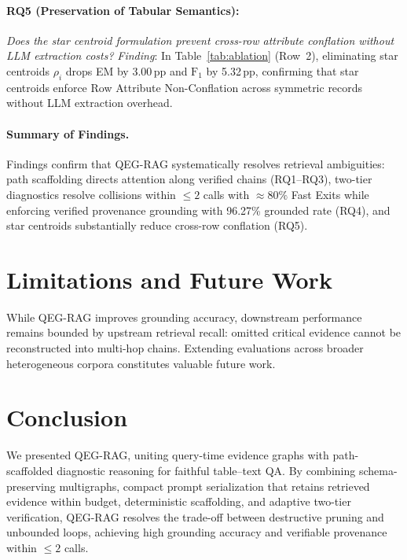 \documentclass[runningheads]{llncs}
\begin{document}
\paragraph{RQ5 (Preservation of Tabular Semantics):}
\emph{Does the star centroid formulation prevent cross-row attribute conflation without LLM extraction costs?} \emph{Finding}: In Table~\ref{tab:ablation} (Row~2), eliminating star centroids $\rho_i$ drops EM by 3.00\,pp and $\text{F}_1$ by 5.32\,pp, confirming that star centroids enforce Row Attribute Non-Conflation across symmetric records without LLM extraction overhead.

\paragraph{Summary of Findings.}
Findings confirm that QEG-RAG systematically resolves retrieval ambiguities: path scaffolding directs attention along verified chains (RQ1--RQ3), two-tier diagnostics resolve collisions within $\le 2$ calls with $\approx 80\%$ Fast Exits while enforcing verified provenance grounding with 96.27\% grounded rate (RQ4), and star centroids substantially reduce cross-row conflation (RQ5).

\vspace{-2.5mm}
\section{Limitations and Future Work}
\label{sec:limitations}
\enlargethispage{5.0\baselineskip}
\vspace{-1mm}
While QEG-RAG improves grounding accuracy, downstream performance remains bounded by upstream retrieval recall: omitted critical evidence cannot be reconstructed into multi-hop chains. Extending evaluations across broader heterogeneous corpora constitutes valuable future work.

\vspace{-2.5mm}
\section{Conclusion}
\label{sec:conclusion}
\vspace{-1mm}
We presented QEG-RAG, uniting query-time evidence graphs with path-scaffolded diagnostic reasoning for faithful table--text QA. By combining schema-preserving multigraphs, compact prompt serialization that retains retrieved evidence within budget, deterministic scaffolding, and adaptive two-tier verification, QEG-RAG resolves the trade-off between destructive pruning and unbounded loops, achieving high grounding accuracy and verifiable provenance within $\le 2$ calls.
\end{document}
